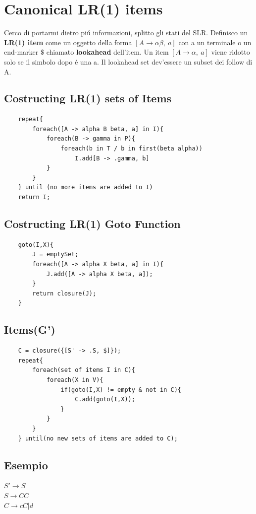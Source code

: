 \section{Canonical LR(1) items}
Cerco di portarmi dietro pi\'u informazioni, splitto gli stati del SLR. Definisco un \textbf{LR(1) item} come un oggetto della forma 
$[A \rightarrow \alpha\beta ,\ a]$ con a un terminale o un end-marker $\$$ chiamato \textbf{lookahead} dell'item.
Un item $[A \rightarrow \alpha ,\ a]$ viene ridotto solo se il simbolo dopo \'e una a. Il lookahead set dev'essere un subset dei follow di A.

\subsection{Costructing LR(1) sets of Items}
\begin{lstlisting}
    repeat{
        foreach([A -> alpha B beta, a] in I){
            foreach(B -> gamma in P){
                foreach(b in T / b in first(beta alpha))
                    I.add[B -> .gamma, b]
            }
        }
    } until (no more items are added to I)
    return I;
\end{lstlisting}

\subsection{Costructing LR(1) Goto Function}
\begin{lstlisting}
    goto(I,X){
        J = emptySet;
        foreach([A -> alpha X beta, a] in I){
            J.add([A -> alpha X beta, a]);
        }
        return closure(J);
    }
\end{lstlisting}

\subsection{Items(G')}
\begin{lstlisting}
    C = closure({[S' -> .S, $]});
    repeat{
        foreach(set of items I in C){
            foreach(X in V){
                if(goto(I,X) != empty & not in C){
                    C.add(goto(I,X));
                }
            }
        }
    } until(no new sets of items are added to C);
\end{lstlisting}

\subsection{Esempio}
$S' \rightarrow S$\\
$S \rightarrow CC$\\
$C \rightarrow cC|d$\\


